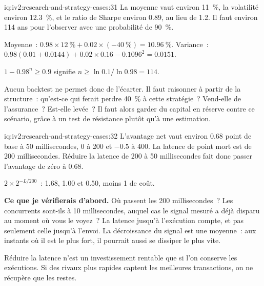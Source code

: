 \begin{solution}{iq:iv2:research-and-strategy-cases:31}
La moyenne vaut environ 11~\%, la volatilité environ 12.3~\%, et le ratio de Sharpe environ 0.89, au lieu de 1.2. Il faut environ 114 ans pour l'observer avec une probabilité de 90~\%.

Moyenne~: $0.98 \times 12~\% + 0.02 \times (-40~\%) = 10.96~\%$. Variance~: $0.98(0.01 + 0.0144) + 0.02 \times 0.16 - 0.1096^2 = 0.0151$.

$1 - 0.98^n \ge 0.9$ signifie $n \ge \ln 0.1/\ln 0.98 = 114$.

Aucun backtest ne permet donc de l'écarter. Il faut raisonner à partir de la structure~: qu'est-ce qui ferait perdre 40~\% à cette stratégie~? Vend-elle de l'assurance~? Est-elle levée~? Il faut alors garder du capital en réserve contre ce scénario, grâce à un test de résistance plutôt qu'à une estimation.

\end{solution}

\begin{solution}{iq:iv2:research-and-strategy-cases:32}
L'avantage net vaut environ 0.68 point de base à 50 millisecondes, 0 à 200 et $-0.5$ à 400. La latence de point mort est de 200 millisecondes. Réduire la latence de 200 à 50 millisecondes fait donc passer l'avantage de zéro à 0.68.

$2 \times 2^{-L/200}$~: 1.68, 1.00 et 0.50, moins 1 de coût.

\textbf{Ce que je vérifierais d'abord.} Où passent les 200 millisecondes~? Les concurrents sont-ils à 10 millisecondes, auquel cas le signal mesuré a déjà disparu au moment où vous le voyez~? La latence jusqu'à l'exécution compte, et pas seulement celle jusqu'à l'envoi. La décroissance du signal est une moyenne~: aux instants où il est le plus fort, il pourrait aussi se dissiper le plus vite.

Réduire la latence n'est un investissement rentable que si l'on conserve les exécutions. Si des rivaux plus rapides captent les meilleures transactions, on ne récupère que les restes.

\end{solution}

